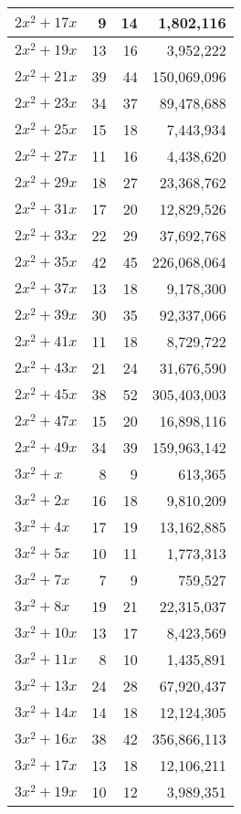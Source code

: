 \documentclass[a4paper]{amsproc}
\theoremstyle{plain}
\begin{document}
\begin{longtable}{ | l | r | r | r | }
$2x^2 + 17x$ & 9 & 14 & 1{,}802{,}116 \\ \hline
$2x^2 + 19x$ & 13 & 16 & 3{,}952{,}222 \\ \hline
$2x^2 + 21x$ & 39 & 44 & 150{,}069{,}096 \\ \hline
$2x^2 + 23x$ & 34 & 37 & 89{,}478{,}688 \\ \hline
$2x^2 + 25x$ & 15 & 18 & 7{,}443{,}934 \\ \hline
$2x^2 + 27x$ & 11 & 16 & 4{,}438{,}620 \\ \hline
$2x^2 + 29x$ & 18 & 27 & 23{,}368{,}762 \\ \hline
$2x^2 + 31x$ & 17 & 20 & 12{,}829{,}526 \\ \hline
$2x^2 + 33x$ & 22 & 29 & 37{,}692{,}768 \\ \hline
$2x^2 + 35x$ & 42 & 45 & 226{,}068{,}064 \\ \hline
$2x^2 + 37x$ & 13 & 18 & 9{,}178{,}300 \\ \hline
$2x^2 + 39x$ & 30 & 35 & 92{,}337{,}066 \\ \hline
$2x^2 + 41x$ & 11 & 18 & 8{,}729{,}722 \\ \hline
$2x^2 + 43x$ & 21 & 24 & 31{,}676{,}590 \\ \hline
$2x^2 + 45x$ & 38 & 52 & 305{,}403{,}003 \\ \hline
$2x^2 + 47x$ & 15 & 20 & 16{,}898{,}116 \\ \hline
$2x^2 + 49x$ & 34 & 39 & 159{,}963{,}142 \\ \hline
$3x^2 + x$ & 8 & 9 & 613{,}365 \\ \hline
$3x^2 + 2x$ & 16 & 18 & 9{,}810{,}209 \\ \hline
$3x^2 + 4x$ & 17 & 19 & 13{,}162{,}885 \\ \hline
$3x^2 + 5x$ & 10 & 11 & 1{,}773{,}313 \\ \hline
$3x^2 + 7x$ & 7 & 9 & 759{,}527 \\ \hline
$3x^2 + 8x$ & 19 & 21 & 22{,}315{,}037 \\ \hline
$3x^2 + 10x$ & 13 & 17 & 8{,}423{,}569 \\ \hline
$3x^2 + 11x$ & 8 & 10 & 1{,}435{,}891 \\ \hline
$3x^2 + 13x$ & 24 & 28 & 67{,}920{,}437 \\ \hline
$3x^2 + 14x$ & 14 & 18 & 12{,}124{,}305 \\ \hline
$3x^2 + 16x$ & 38 & 42 & 356{,}866{,}113 \\ \hline
$3x^2 + 17x$ & 13 & 18 & 12{,}106{,}211 \\ \hline
$3x^2 + 19x$ & 10 & 12 & 3{,}989{,}351 \\ \hline

\end{longtable}
\end{document}
